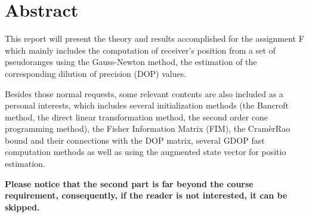 \chapter{Abstract}
This report will present the theory and results accomplished for the assignment F which mainly includes the computation of receiver's position from a set of pseudoranges using the Gauss-Newton method, the estimation of the corresponding dilution of precision (DOP) values.


Besides those normal requests, some relevant contents are also included 
as a personal interests, which includes several initialization 
methods (the Bancroft method, the direct linear transformation method, 
the second order cone programming method), the Fisher Information Matrix 
(FIM), the Cram\`erRao bound and their connections with the DOP matrix, 
several GDOP fast computation methods as well as using the augmented state vector for positio estimation.




\textbf{Please notice that the second part is far beyond the course requirement, consequently, if the reader is not interested, it can be skipped.}

